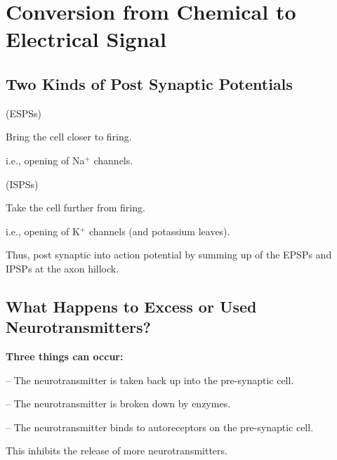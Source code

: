 \section{Conversion from Chemical to Electrical Signal}

\subsection{Two Kinds of Post Synaptic Potentials}

\begin{coloredlist}
    \item {} (ESPSs)
    \begin{coloredlist}
        \item Bring the cell closer to firing.
        \item i.e., opening of Na\(^+\) channels.
    \end{coloredlist}
    \item {} (ISPSs)
    \begin{coloredlist}
        \item Take the cell further from firing.
        \item i.e., opening of K\(^+\) channels (and potassium leaves).
    \end{coloredlist}
    \item Thus, post synaptic into action potential by summing up of the EPSPs and IPSPs at the axon hillock.
\end{coloredlist}

\subsection{What Happens to Excess or Used Neurotransmitters?}

\begin{coloredlist}
    \item \textbf{Three things can occur:}
    \begin{coloredlist}
        \item {} -- The neurotransmitter is taken back up into the pre-synaptic cell.
        \item {} -- The neurotransmitter is broken down by enzymes.
        \item {} -- The neurotransmitter binds to autoreceptors on the pre-synaptic cell.
        \begin{coloredlist}
            \item This inhibits the release of more neurotransmitters.
        \end{coloredlist}
    \end{coloredlist}
\end{coloredlist}

